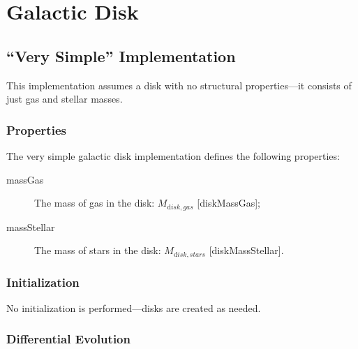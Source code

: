 \section{Galactic Disk}

\subsection{``Very Simple'' Implementation}

This implementation assumes a disk with no structural properties---it consists of just gas and stellar masses.

\subsubsection{Properties}

The very simple galactic disk implementation defines the following properties:
\begin{description}
 \item [{\normalfont \ttfamily massGas}] The mass of gas in the disk: $M_{\mathrm disk, gas}$ [{\normalfont \ttfamily diskMassGas}];
 \item [{\normalfont \ttfamily massStellar}] The mass of stars in the disk: $M_{\mathrm disk, stars}$ [{\normalfont \ttfamily diskMassStellar}].
\end{description}

\subsubsection{Initialization}

No initialization is performed---disks are created as needed.

\subsubsection{Differential Evolution}

